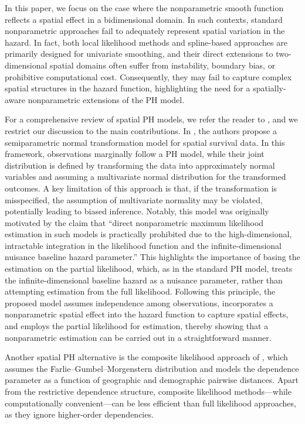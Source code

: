 \documentclass[11pt]{article}
\begin{document}
In this paper, we focus on the case where the nonparametric smooth function reflects a spatial effect in a bidimensional domain. In such contexts, standard nonparametric approaches fail to adequately represent spatial variation in the hazard. In fact, both local likelihood methods and spline-based approaches are primarily designed for univariate smoothing, and their direct extensions to two-dimensional spatial domains often suffer from instability, boundary bias, or prohibitive computational cost. Consequently, they may fail to capture complex spatial structures in the hazard function, highlighting the need for a spatially-aware nonparametric extensions of the PH model.



For a comprehensive review of spatial PH models, we refer the reader to \cite{hanson2014spatial}, and we restrict our discussion to the main contributions. In \cite{li2006semiparametric}, the authors propose a semiparametric normal transformation model for spatial survival data. In this framework, observations marginally follow a PH model, while their joint distribution is defined by transforming the data into approximately normal variables and assuming a multivariate normal distribution for the transformed outcomes. A key limitation of this approach is that, if the transformation is misspecified, the assumption of multivariate normality may be violated, potentially leading to biased inference. Notably, this model was originally motivated by the claim that ``direct nonparametric maximum likelihood estimation in such models is practically prohibited due to the high-dimensional, intractable integration in the likelihood function and the infinite-dimensional nuisance baseline hazard parameter.'' This highlights the importance of basing the estimation on the partial likelihood, which, as in the standard PH model, treats the infinite-dimensional baseline hazard as a nuisance parameter, rather than attempting estimation from the full likelihood. Following this principle, the proposed model assumes independence among observations, incorporates a nonparametric spatial effect into the hazard function to capture spatial effects, and employs the partial likelihood for estimation, thereby showing that a nonparametric estimation can be carried out in a straightforward manner.

Another spatial PH alternative is the composite likelihood approach of \cite{paik2012composite}, which assumes the Farlie--Gumbel--Morgenstern distribution and models the dependence parameter as a function of geographic and demographic pairwise distances. Apart from the restrictive dependence structure, composite likelihood methods---while computationally convenient---can be less efficient than full likelihood approaches, as they ignore higher-order dependencies.  
\end{document}
